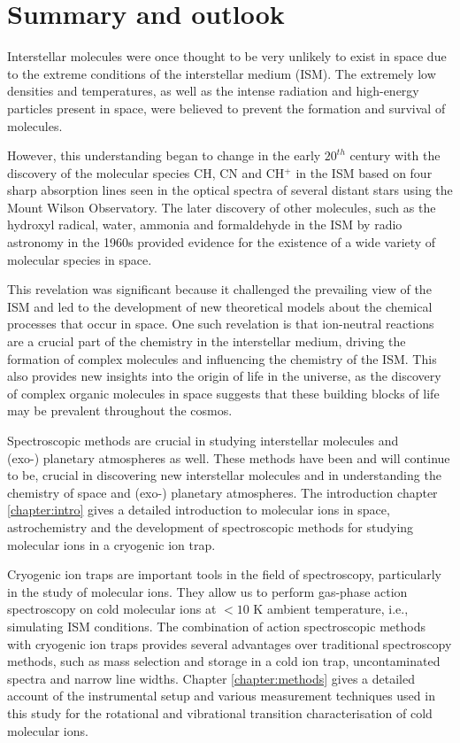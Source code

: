 \chapter{Summary and outlook}
Interstellar molecules were once thought to be very unlikely to exist in space due to the extreme conditions of the interstellar medium (ISM). The extremely low densities and temperatures, as well as the intense radiation and high-energy particles present in space, were believed to prevent the formation and survival of molecules.

However, this understanding began to change in the early $20^{th}$ century with the discovery of the molecular species CH, CN and CH$^+$ in the ISM based on four sharp absorption lines seen in the optical spectra of several distant stars using the Mount Wilson Observatory. The later discovery of other molecules, such as the hydroxyl radical, water, ammonia and formaldehyde in the ISM by radio astronomy in the 1960s provided evidence for the existence of a wide variety of molecular species in space.

This revelation was significant because it challenged the prevailing view of the ISM and led to the development of new theoretical models about the chemical processes that occur in space. One such revelation is that ion-neutral reactions are a crucial part of the chemistry in the interstellar medium, driving the formation of complex molecules and influencing the chemistry of the ISM. This also provides new insights into the origin of life in the universe, as the discovery of complex organic molecules in space suggests that these building blocks of life may be prevalent throughout the cosmos.

Spectroscopic methods are crucial in studying interstellar molecules and \\(exo-) planetary atmospheres as well. These methods have been and will continue to be, crucial in discovering new interstellar molecules and in understanding the chemistry of space and (exo-) planetary atmospheres. The introduction chapter \ref{chapter:intro} gives a detailed introduction to molecular ions in space, astrochemistry and the development of spectroscopic methods for studying molecular ions in a cryogenic ion trap.

Cryogenic ion traps are important tools in the field of spectroscopy, particularly in the study of molecular ions. They allow us to perform gas-phase action spectroscopy on cold molecular ions at $< 10$ K ambient temperature, i.e., simulating ISM conditions. The combination of action spectroscopic methods with cryogenic ion traps provides several advantages over traditional spectroscopy methods, such as mass selection and storage in a cold ion trap, uncontaminated spectra and narrow line widths. Chapter \ref{chapter:methods} gives a detailed account of the instrumental setup and various measurement techniques used in this study for the rotational and vibrational transition characterisation of cold molecular ions.

